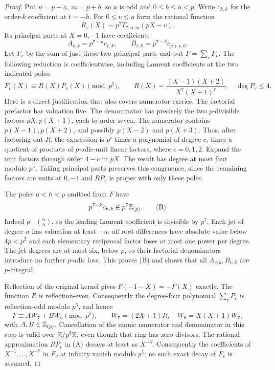 \begin{proof}
Put $n=p+a$, $m=p+b$, so $a$ is odd and $0\le b\le a<p$.
Write $c_{h,k}$ for the order-$k$ coefficient at $t=-h$.
For $0\le v\le a$ form the rational function
\[
 R_v(X)=p^7T_{7,n,m}(pX-v).
\]
Its principal parts at $X=0,-1$ have coefficients
\[
 A_{v,k}=p^{7-k}c_{v,k},\qquad
 B_{v,k}=p^{7-k}c_{p+v,k}.
\]
Let $F_v$ be the sum of just these two principal parts and put $F=\sum_vF_v$.
The following reduction is coefficientwise, including Laurent coefficients
at the two indicated poles:
\[
 F_v(X)\equiv R(X)P_v(X)\pmod{p^5},\qquad
 R(X)=\frac{(X-1)(X+2)}{X^7(X+1)^7},\quad \deg P_v\le4.       \tag{A}
\]
Here is a direct justification that also covers numerator carries.
The factorial prefactor has valuation five. The denominator has precisely
the two $p$-divisible factors $pX,p(X+1)$, each to order seven.
The numerator contains $p(X-1),p(X+2)$, and possibly $p(X-2)$ and
$p(X+3)$. Thus, after factoring out $R$, the expression is $p^c$
times a polynomial of degree $c$, times a quotient of products of
$p$-adic-unit linear factors, where $c=0,1,2$.
Expand the unit factors through order $4-c$ in $pX$.
The result has degree at most four modulo $p^5$.
Taking principal parts preserves this congruence, since the remaining
factors are units at $0,-1$ and $RP_v$ is proper with only these poles.

The poles $a<h<p$ omitted from $F$ have
\[
 p^{7-k}c_{h,k}\in p^7\mathbb Z_{(p)}.                              \tag{B}
\]
Indeed $p\mid\binom nh$, so the leading Laurent coefficient is divisible
by $p^7$. Each jet of degree $u$ has valuation at least $-u$:
all root differences have absolute value below $4p<p^2$ and each
elementary reciprocal factor loses at most one power per degree.
The jet degrees are at most six, below $p$, so their factorial
denominators introduce no further $p$-adic loss.
This proves (B) and shows that all $A_{v,k},B_{v,k}$ are $p$-integral.

Reflection of the original kernel gives $F(-1-X)=-F(X)$ exactly.
The function $R$ is reflection-even. Consequently the degree-four
polynomial $\sum_vP_v$ is reflection-odd modulo $p^5$, and hence
\[
 F\equiv A W_7+B W_6\pmod{p^5},\qquad
 W_7=(2X+1)R,\quad W_6=X(X+1)W_7,                            \tag{C}
\]
with $A,B\in\mathbb Z_{(p)}$.
Cancellation of the monic numerator and denominator in this step is
valid over $\mathbb Z/p^5\mathbb Z$, even though that ring has zero divisors.
The rational approximation $RP_v$ in (A) decays at least as $X^{-8}$.
Consequently the coefficients of $X^{-1},\ldots,X^{-7}$ in $F_v$
at infinity vanish modulo $p^5$; no such exact decay of $F_v$ is assumed.


\end{proof}
